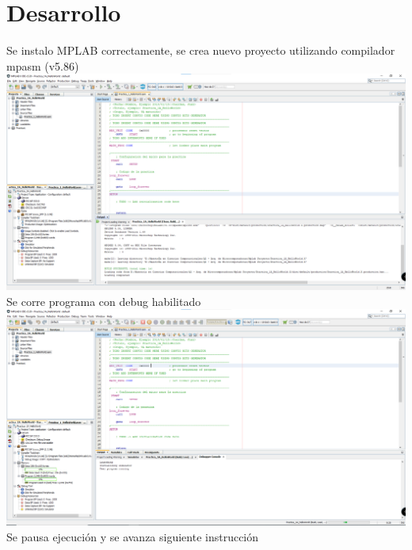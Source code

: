 \documentclass{article}
\begin{document}
\section{Desarrollo}
Se instalo MPLAB correctamente, se crea nuevo proyecto utilizando compilador mpasm (v5.86)\\
\includegraphics[width=\textwidth]{compilation}\\
Se corre programa con debug habilitado\\
\includegraphics[width=\textwidth]{debug-init}\\
Se pausa ejecución y se avanza siguiente instrucción\\
\end{document}
